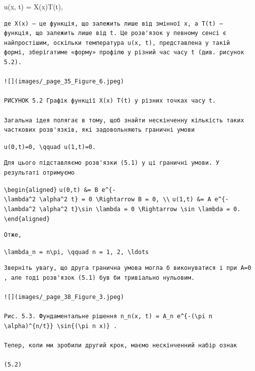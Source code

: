 \documentclass[
  ukrainian,
]{article}
\begin{document}
u(x, t) = X(x)T(t),

\begin{verbatim}
де X(x) — це функція, що залежить лише від змінної x, а T(t) — функція, що залежить лише від t. Це розв'язок у певному сенсі є найпростішим, оскільки температура u(x, t), представлена у такій формі, зберігатиме «форму» профілю у різний час часу t (див. рисунок 5.2).

![](images/_page_35_Figure_6.jpeg)

РИСУНОК 5.2 Графік функції X(x) T(t) у різних точках часу t.

Загальна ідея полягає в тому, щоб знайти нескінченну кількість таких часткових розв'язків, які задовольняють граничні умови
\end{verbatim}

\texttt{u(0,t)=0,\ \textbackslash{}qquad\ u(1,t)=0.}

\begin{verbatim}
Для цього підставляємо розв'язки (5.1) у ці граничні умови. У результаті отримуємо
\end{verbatim}

\texttt{\textbackslash{}begin\{aligned\}}
\texttt{u(0,t)\ \&=\ B\ e\^{}\{-\textbackslash{}lambda\^{}2\ \textbackslash{}alpha\^{}2\ t\}\ =\ 0\ \textbackslash{}Rightarrow\ B\ =\ 0,\ \textbackslash{}\textbackslash{}}
\texttt{u(1,t)\ \&=\ A\ e\^{}\{-\textbackslash{}lambda\^{}2\ \textbackslash{}alpha\^{}2\ t\}\textbackslash{}sin\ \textbackslash{}lambda\ =\ 0\ \textbackslash{}Rightarrow\ \textbackslash{}sin\ \textbackslash{}lambda\ =\ 0.}
\texttt{\textbackslash{}end\{aligned\}}

\begin{verbatim}
Отже,
\end{verbatim}

\texttt{\textbackslash{}lambda\_n\ =\ n\textbackslash{}pi,\ \textbackslash{}qquad\ n\ =\ 1,\ 2,\ \textbackslash{}ldots}

\begin{verbatim}
Зверніть увагу, що друга гранична умова могла б виконуватися і при A=0 , але тоді розв'язок (5.1) був би тривіально нульовим.

![](images/_page_38_Figure_3.jpeg)

Рис. 5.3. Фундаментальне рішення n_n(x, t) = A_n e^{-(\pi n \alpha)^{n/t}} \sin{(\pi n x)} .

Тепер, коли ми зробили другий крок, маємо нескінченний набір ознак

(5.2)
\end{verbatim}
\end{document}
